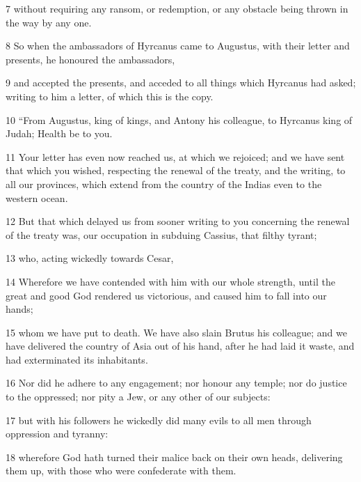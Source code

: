 \par 7 without requiring any ransom, or redemption, or any obstacle being thrown in the way by any one. 

\par 8 So when the ambassadors of Hyrcanus came to Augustus, with their letter and presents, he honoured the ambassadors, 

\par 9 and accepted the presents, and acceded to all things which Hyrcanus had asked; writing to him a letter, of which this is the copy. 

\par 10 “From Augustus, king of kings, and Antony his colleague, to Hyrcanus king of Judah; Health be to you. 

\par 11 Your letter has even now reached us, at which we rejoiced; and we have sent that which you wished, respecting the renewal of the treaty, and the writing, to all our provinces, which extend from the country of the Indias even to the western ocean. 

\par 12 But that which delayed us from sooner writing to you concerning the renewal of the treaty was, our occupation in subduing Cassius, that filthy tyrant; 

\par 13 who, acting wickedly towards Cesar, 

\par 14 Wherefore we have contended with him with our whole strength, until the great and good God rendered us victorious, and caused him to fall into our hands; 

\par 15 whom we have put to death. We have also slain Brutus his colleague; and we have delivered the country of Asia out of his hand, after he had laid it waste, and had exterminated its inhabitants. 

\par 16 Nor did he adhere to any engagement; nor honour any temple; nor do justice to the oppressed; nor pity a Jew, or any other of our subjects: 

\par 17 but with his followers he wickedly did many evils to all men through oppression and tyranny: 

\par 18 wherefore God hath turned their malice back on their own heads, delivering them up, with those who were confederate with them. 

